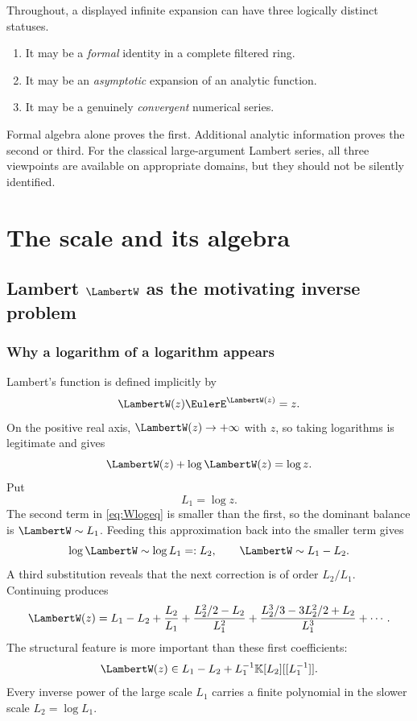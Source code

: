 \documentclass[11pt,oneside,openany]{book}
\newcommand{\K}{\mathbb{K}}
\begin{document}
\begin{cautionbox}
Throughout, a displayed infinite expansion can have three logically distinct
statuses.
\begin{enumerate}
\item It may be a \emph{formal} identity in a complete filtered ring.
\item It may be an \emph{asymptotic} expansion of an analytic function.
\item It may be a genuinely \emph{convergent} numerical series.
\end{enumerate}
Formal algebra alone proves the first.  Additional analytic information proves
the second or third.  For the classical large-argument Lambert series, all
three viewpoints are available on appropriate domains, but they should not be
silently identified.
\end{cautionbox}

\tableofcontents

\mainmatter

\part{The scale and its algebra}

\chapter{Lambert \texorpdfstring{\(\LambertW\)}{W} as the motivating inverse problem}
\label{ch:motivation}

\section{Why a logarithm of a logarithm appears}
Lambert's function is defined implicitly by
\begin{equation}\label{eq:Wdef}
  \LambertW(z)\EulerE^{\LambertW(z)}=z.
\end{equation}
On the positive real axis, \(\LambertW(z)\to+\infty\) with \(z\), so taking logarithms
is legitimate and gives
\begin{equation}\label{eq:Wlogeq}
  \LambertW(z)+\log \LambertW(z)=\log z.
\end{equation}
Put
\[
  L_1=\log z.
\]
The second term in \cref{eq:Wlogeq} is smaller than the first, so the dominant
balance is \(\LambertW\sim L_1\).  Feeding this approximation back into the smaller
term gives
\[
  \log \LambertW\sim\log L_1=:L_2,
  \qquad
  \LambertW\sim L_1-L_2.
\]
A third substitution reveals that the next correction is of order
\(L_2/L_1\).  Continuing produces
\begin{equation}\label{eq:Wshape}
  \LambertW(z)=L_1-L_2+
  \frac{L_2}{L_1}+
  \frac{L_2^2/2-L_2}{L_1^2}+
  \frac{L_2^3/3-3L_2^2/2+L_2}{L_1^3}+\cdots.
\end{equation}
The structural feature is more important than these first coefficients:
\begin{equation}\label{eq:Wcoset}
  \LambertW(z)\in
  L_1-L_2+L_1^{-1}\K[L_2][[L_1^{-1}]].
\end{equation}
Every inverse power of the large scale \(L_1\) carries a finite polynomial in
the slower scale \(L_2=\log L_1\).
\end{document}

